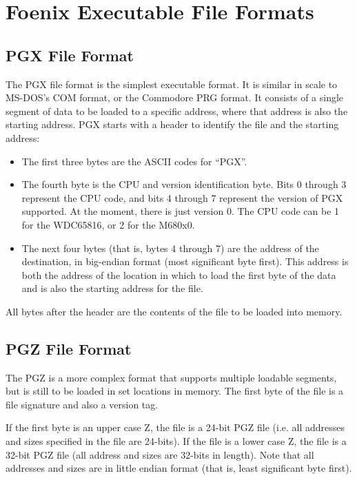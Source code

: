 \section*{Foenix Executable File Formats}

\subsection*{PGX File Format}
The PGX file format is the simplest executable format. It is similar in scale to MS-DOS's COM format, or the Commodore PRG format.
It consists of a single segment of data to be loaded to a specific address, where that address is also the starting address.
PGX starts with a header to identify the file and the starting address:

\begin{itemize}
	\item The first three bytes are the ASCII codes for ``PGX''. 
    \item The fourth byte is the CPU and version identification byte.
	Bits 0 through 3 represent the CPU code, and bits 4 through 7 represent the version of PGX supported.
	At the moment, there is just version 0. The CPU code can be 1 for the WDC65816, or 2 for the M680x0.
    \item The next four bytes (that is, bytes 4 through 7) are the address of the destination, in big-endian format (most significant byte first).
	This address is both the address of the location in which to load the first byte of the data and is also the starting address for the file.
\end{itemize}

All bytes after the header are the contents of the file to be loaded into memory.

\subsection*{PGZ File Format}
The PGZ is a more complex format that supports multiple loadable segments, but is still to be loaded in set locations in memory.
The first byte of the file is a file signature and also a version tag.

If the first byte is an upper case Z, the file is a 24-bit PGZ file (i.e. all addresses and sizes specified in the file are 24-bits).
If the file is a lower case Z, the file is a 32-bit PGZ file (all address and sizes are 32-bits in length).
Note that all addresses and sizes are in little endian format (that is, least significant byte first).


